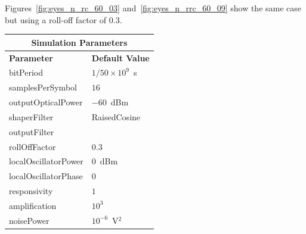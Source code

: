 \begin{refsection}
Figures~\ref{fig:eyes_n_rc_60_03} and~\ref{fig:eyes_n_rrc_60_09} show the same
case but using a roll-off factor of 0.3.
\begin{table}[H]
	\centering
	\footnotesize
	\begin{tabular}{|l|l|}
		\hline
		\multicolumn{2}{|c|}{ \textbf{Simulation Parameters} } \\
		\hline
		\textbf{Parameter}     & \textbf{Default Value}                                     \\\hline
		bitPeriod              & $1/50\times10^9$~s														\\\hline
		samplesPerSymbol       & $16$                                                       \\\hline
		outputOpticalPower     & $-60$~dBm 													\\ \hline
		shaperFilter	       & RaisedCosine												\\ \hline
		outputFilter		   &   												\\ \hline
		rollOffFactor		   & 0.3														\\ \hline
		localOscillatorPower   & $0$~dBm                                                    \\ \hline
		localOscillatorPhase   & $0$                                                        \\ \hline
		responsivity           & $1$                                                        \\ \hline
		amplification          & $10^3$                                                     \\ \hline
		noisePower   & $10^{-6}$~V$^2$                             					\\ \hline

\end{tabular}
\end{table}
\end{refsection}
